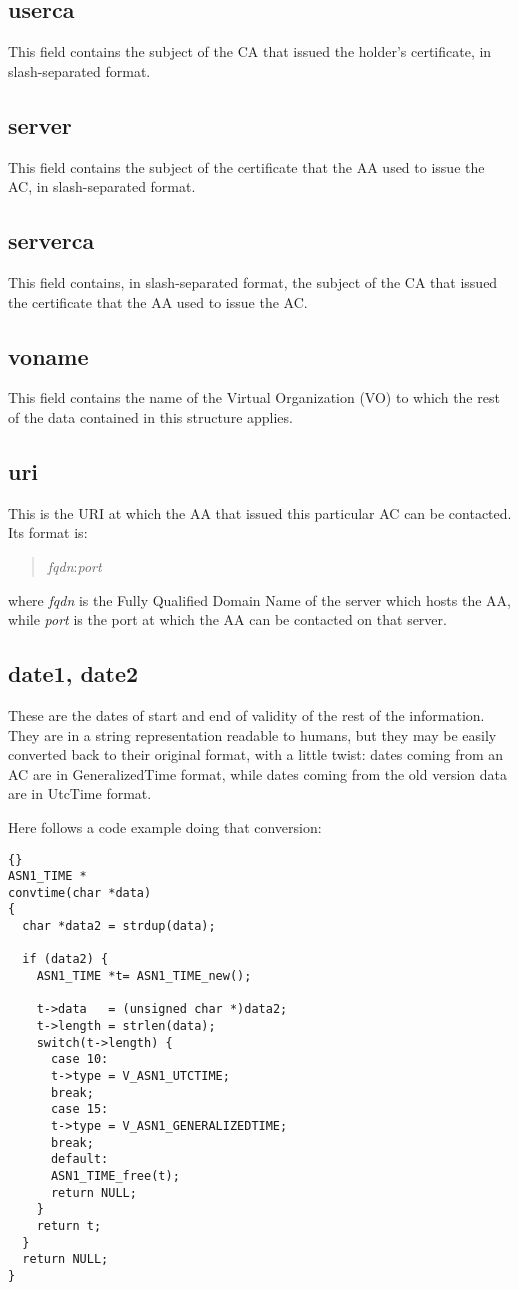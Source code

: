 \documentclass[a4paper]{book}
\begin{document}
\subsection{userca}
This field contains the subject of the CA that issued the holder's
certificate, in slash-separated format.

\subsection{server}
This field contains the subject of the certificate that the AA used to
issue the AC, in slash-separated format.

\subsection{serverca}
This field contains, in slash-separated format, the subject of the CA that
issued the certificate that the AA used to issue the AC.

\subsection{voname}
This field contains the name of the Virtual Organization (VO) to which
the rest of the data contained in this structure applies.

\subsection{uri}
This is the URI at which the AA that issued this particular AC can be
contacted. Its format is:
\begin{quote}
\emph{fqdn}:\emph{port}
\end{quote}
where \emph{fqdn} is the Fully Qualified Domain Name of the server
which hosts the AA, while \emph{port} is the port at which the AA can
be contacted on that server.

\subsection{date1, date2}
These are the dates of start and end of validity of the rest of the
information.  They are in a string representation readable to humans,
but they may be easily converted back to their original format, with a
little twist: dates coming from an AC are in GeneralizedTime format,
while dates coming from the old version data are in UtcTime format.

Here follows a code example doing that conversion:\bigskip\bigskip
{\begin{lstlisting}{}
ASN1_TIME *
convtime(char *data)
{
  char *data2 = strdup(data);

  if (data2) {
    ASN1_TIME *t= ASN1_TIME_new();

    t->data   = (unsigned char *)data2;
    t->length = strlen(data);
    switch(t->length) {
      case 10:
      t->type = V_ASN1_UTCTIME;
      break;
      case 15:
      t->type = V_ASN1_GENERALIZEDTIME;
      break;
      default:
      ASN1_TIME_free(t);
      return NULL;
    }
    return t;
  }
  return NULL;
}
\end{lstlisting}}
\end{document}
